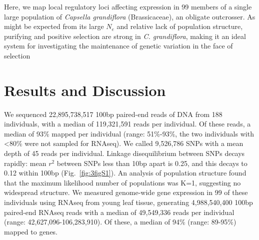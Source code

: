 Here, we map local regulatory loci affecting expression in 99 members of a single large population of \textit{Capsella grandiflora} (Brassicaceae), an obligate outcrosser. As might be expected from its large $N_{e}$ and relative lack of population structure, purifying and positive selection are strong in \textit{C. grandiflora}\citep{Williamson2014-tf,St_onge2011-jz}, making it an ideal system for investigating the maintenance of genetic variation in the face of selection 

\section{Results and Discussion}
We sequenced 22,895,738,517 100bp paired-end reads of DNA from 188 individuals, with a median of 119,321,591 reads per individual. Of these reads, a median of 93\% mapped per individual (range: 51\%-93\%, the two individuals with \textless 80\% were not sampled for RNAseq). We called 9,526,786 SNPs with a mean depth of 45 reads per individual. Linkage disequilibrium between SNPs decays rapidly: mean $r^{2}$ between SNPs less than 10bp apart is 0.25, and this decays to 0.12 within 100bp (Fig.~\ref{fig:3figS1}). An analysis of population structure \citep{Raj2014-im} found that the maximum likelihood number of populations was K=1, suggesting no widespread structure. We measured genome-wide gene expression in 99 of these individuals using RNAseq from young leaf tissue, generating 4,988,540,400 100bp paired-end RNAseq reads with a median of 49,549,336 reads per individual (range: 42,627,096-106,283,910). Of these, a median of 94\% (range: 89-95\%) mapped to genes. 

